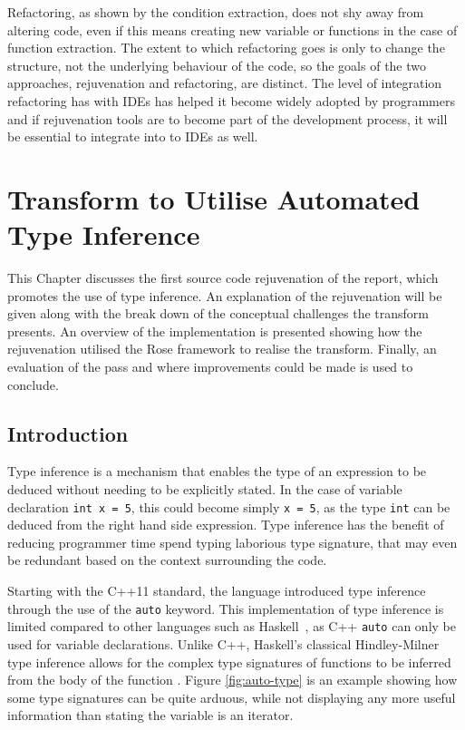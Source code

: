 \documentclass[bsc,frontabs,singlespacing,twoside,parskip,deptreport]{infthesis}
\begin{document}
Refactoring, as shown by the condition extraction, does not shy away from altering code, even if this means creating new variable or functions in the case of function extraction. The extent to which refactoring goes is only to change the structure, not the underlying behaviour of the code, so the goals of the two approaches, rejuvenation and refactoring, are distinct. The level of integration refactoring has with IDEs has helped it become widely adopted by programmers and if rejuvenation tools are to become part of the development process, it will be essential to integrate into to IDEs as well.




\chapter{Transform to Utilise Automated Type Inference}\label{chp:auto-tranform}
This Chapter discusses the first source code rejuvenation of the report, which promotes the use of type inference. An explanation of the rejuvenation will be given along with the break down of the conceptual challenges the transform presents. An overview of the implementation is presented showing how the rejuvenation utilised the Rose framework to realise the transform. Finally, an evaluation of the pass and where improvements could be made is used to conclude.

\section{Introduction}
Type inference is a mechanism that enables the type of an expression to be deduced without needing to be explicitly stated. In the case of variable declaration \texttt{int x = 5}, this could become simply \texttt{x = 5}, as the type \texttt{int} can be deduced from the right hand side expression. Type inference has the benefit of reducing programmer time spend typing laborious type signature, that may even be redundant based on the context surrounding the code. 


Starting with the C++11 standard, the language introduced type inference through the use of the \texttt{auto} keyword. This implementation of type inference is limited compared to other languages such as Haskell~\cite{LYAHFGG_Lipovaca}, as C++ \texttt{auto} can only be used for variable declarations. Unlike C++, Haskell's classical Hindley-Milner type inference allows for the complex type signatures of functions to be inferred from the body of the function \cite{HASK_TYPE_INF}. Figure \ref{fig:auto-type} is an example  showing  how some type signatures can be quite arduous, while not displaying any more useful information than stating the variable is an iterator.
\end{document}
